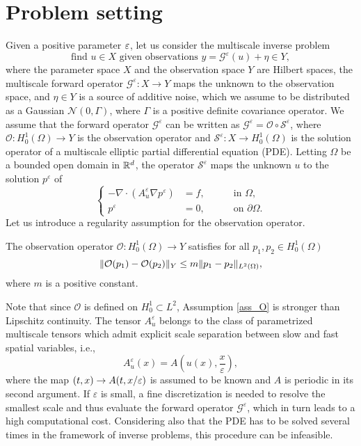 \section{Problem setting}\label{Setting}

Given a positive parameter $\varepsilon$, let us consider the multiscale inverse problem
\begin{equation}
\label{multiscale_inverse_problem}
\text{find } u \in X \text{ given observations } y = \mathcal{G}^{\varepsilon}(u) + \eta \in Y,
\end{equation}
where the parameter space $X$ and the observation space $Y$ are Hilbert spaces, the multiscale forward operator $\mathcal{G}^{\varepsilon} \colon X \to Y$ maps the unknown to the observation space, and $\eta \in Y$ is a source of additive noise, which we assume to be distributed as a Gaussian $\mathcal N(0, \Gamma)$, where $\Gamma$ is a positive definite covariance operator. We assume that the forward operator $\mathcal{G}^{\varepsilon}$ can be written as $\mathcal{G}^{\varepsilon} = \mathcal{O} \circ \mathcal{S}^{\varepsilon}$, where $\mathcal{O} \colon H^1_0(\Omega) \to Y$ is the observation operator and $\mathcal{S}^{\varepsilon} \colon X \to H^1_0(\Omega)$ is the solution operator of a multiscale elliptic partial differential equation (PDE). Letting $\Omega$ be a bounded open domain in $\mathbb{R}^d$, the operator $\mathcal{S}^{\varepsilon}$ maps the unknown $u$ to the solution $p^{\varepsilon}$ of
\begin{equation}
\label{intro_problem_multiscale}
\left\{
\begin{alignedat}{2}
- \nabla \cdot ( A^{\varepsilon}_u \nabla p^{\varepsilon} ) &= f, \quad && \text{ in } \Omega, \\
	p^{\varepsilon} &= 0, \quad && \text{ on } \partial \Omega.
\end{alignedat}
\right.
\end{equation}
Let us introduce a regularity assumption for the observation operator.
\begin{assumption}\label{ass_O}
The observation operator $\mathcal{O} \colon H^1_0(\Omega) \to Y$ satisfies for all $p_1, p_2 \in H^1_0(\Omega)$
\[ \lVert\mathcal{O}(p_1) - \mathcal{O}(p_2)\rVert_Y \le m \lVert p_1 - p_2\rVert_{L^2(\Omega)}, \]
where $m$ is a positive constant.
\end{assumption}
Note that since $\mathcal O$ is defined on $H^1_0 \subset L^2$, Assumption \ref{ass_O} is stronger than Lipschitz continuity. The tensor $A^{\varepsilon}_u$ belongs to the class of parametrized multiscale tensors which admit explicit scale separation between slow and fast spatial variables, i.e.,
\begin{equation*}
A^{\varepsilon}_u(x) = A \left ( u(x), \frac{x}{\varepsilon} \right ),
\end{equation*}
where the map $(t,x) \to A(t, x/\varepsilon)$ is assumed to be known and $A$ is periodic in its second argument. If $\varepsilon$ is small, a fine discretization is needed to resolve the smallest scale and thus evaluate the forward operator $\mathcal{G}^{\varepsilon}$, which in turn leads to a high computational cost. Considering also that the PDE has to be solved several times in the framework of inverse problems, this procedure can be infeasible.

